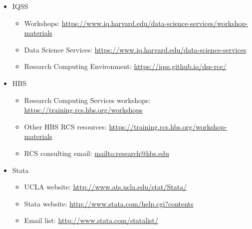 \documentclass[
]{book}
\providecommand{\tightlist}{%
  \setlength{\itemsep}{0pt}\setlength{\parskip}{0pt}}
\begin{document}
\begin{itemize}
\tightlist
\item
  IQSS

  \begin{itemize}
  \tightlist
  \item
    Workshops: \url{https://www.iq.harvard.edu/data-science-services/workshop-materials}
  \item
    Data Science Services: \url{https://www.iq.harvard.edu/data-science-services}
  \item
    Research Computing Environment: \url{https://iqss.github.io/dss-rce/}
  \end{itemize}
\item
  HBS

  \begin{itemize}
  \tightlist
  \item
    Research Computing Services workshops: \url{https://training.rcs.hbs.org/workshops}
  \item
    Other HBS RCS resources: \url{https://training.rcs.hbs.org/workshop-materials}
  \item
    RCS consulting email: \url{mailto:research@hbs.edu}
  \end{itemize}
\item
  Stata

  \begin{itemize}
  \tightlist
  \item
    UCLA website: \url{http://www.ats.ucla.edu/stat/Stata/}
  \item
    Stata website: \url{http://www.stata.com/help.cgi?contents}
  \item
    Email list: \url{http://www.stata.com/statalist/}
  \end{itemize}
\end{itemize}
\end{document}
